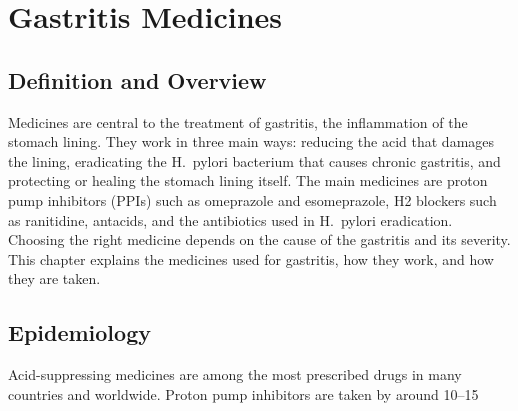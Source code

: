 \chapter{Gastritis Medicines}

\section*{Definition and Overview}
Medicines are central to the treatment of gastritis, the inflammation of the stomach lining. They work in three main ways: reducing the acid that damages the lining, eradicating the H.\ pylori bacterium that causes chronic gastritis, and protecting or healing the stomach lining itself. The main medicines are proton pump inhibitors (PPIs) such as omeprazole and esomeprazole, H2 blockers such as ranitidine, antacids, and the antibiotics used in H.\ pylori eradication. Choosing the right medicine depends on the cause of the gastritis and its severity. This chapter explains the medicines used for gastritis, how they work, and how they are taken.

\section*{Epidemiology}
Acid-suppressing medicines are among the most prescribed drugs in many countries and worldwide. Proton pump inhibitors are taken by around 10--15%

